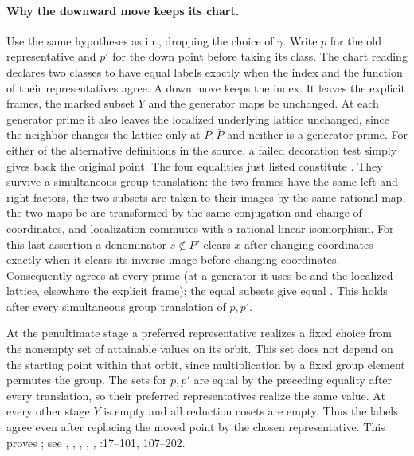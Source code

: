 \paragraph{Why the downward move keeps its chart.}
Use the same hypotheses as in , dropping the choice
of $\gamma$. Write $p$ for the old representative and $p'$ for the
down point before taking its class. The chart reading declares two
classes to have equal labels exactly when the index and the function
 of their representatives agree. A down move keeps the
index. It leaves the explicit frames, the marked subset $Y$ and the
generator maps $\mathrm{be}$ unchanged. At each generator prime it
also leaves the localized underlying lattice unchanged, since the
neighbor changes the lattice only at $P,\bar P$ and neither is a
generator prime. For either of the alternative definitions in the
source, a failed decoration test simply gives back the original point.
The four equalities just listed constitute . They survive
a simultaneous group translation: the two frames have the same left
and right factors, the two subsets are taken to their images by the
same rational map, the two maps $\mathrm{be}$ are transformed by the
same conjugation and change of coordinates, and localization commutes
with a rational linear isomorphism. For this last assertion a
denominator $s\notin P'$ clears $x$ after changing coordinates exactly
when it clears its inverse image before changing coordinates.
Consequently  agrees at every prime (at a generator it
uses $\mathrm{be}$ and the localized lattice, elsewhere the explicit
frame); the equal subsets give equal . This holds after
every simultaneous group translation of $p,p'$.

At the penultimate stage a preferred representative realizes a fixed
choice from the nonempty set of attainable  values on its
orbit. This set does not depend on the starting point within that
orbit, since multiplication by a fixed group element permutes the group.
The sets for $p,p'$ are equal by the preceding equality after every
translation, so their preferred representatives realize the same value.
At every other stage $Y$ is empty and all reduction cosets are empty.
Thus the labels agree even after replacing the moved point by the
chosen representative. This proves ;
see , , ,
, ,
:17--101, 107--202.

